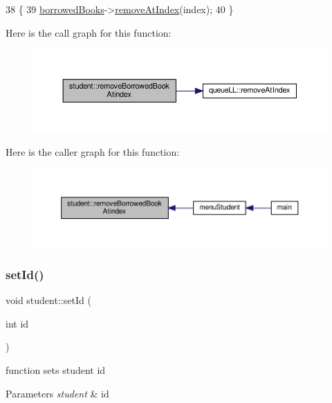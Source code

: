 \begin{DoxyCode}
38                                                  \{
39     \hyperlink{classstudent_ab477f6c1525709586ea41364dc8c568b}{borrowedBooks}->\hyperlink{classqueue_l_l_abe3f175ee8c25c55d18650c5b13297b1}{removeAtIndex}(index);
40 \}
\end{DoxyCode}
Here is the call graph for this function\+:
\nopagebreak
\begin{figure}[H]
\begin{center}
\leavevmode
\includegraphics[width=350pt]{classstudent_a5387f0131233065383ca141ddec50de6_cgraph}
\end{center}
\end{figure}
Here is the caller graph for this function\+:
\nopagebreak
\begin{figure}[H]
\begin{center}
\leavevmode
\includegraphics[width=350pt]{classstudent_a5387f0131233065383ca141ddec50de6_icgraph}
\end{center}
\end{figure}
\mbox{\label{classstudent_abda32701d8741f07e9aa45d339a122ff}} 
\subsubsection{\texorpdfstring{set\+Id()}{setId()}}
{\footnotesize\ttfamily void student\+::set\+Id (\begin{DoxyParamCaption}\item[{int}]{id }\end{DoxyParamCaption})}

function sets student id 
\begin{DoxyParams}{Parameters}
{\em student} & id \\
\hline
\end{DoxyParams}


